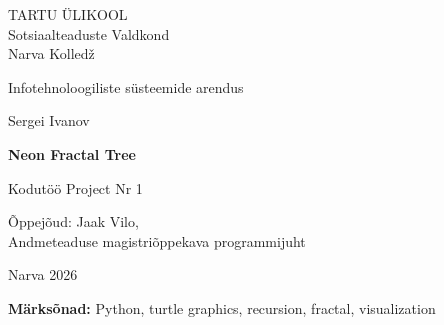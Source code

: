 \begin{titlepage}
    \centering

    {\fontsize{12pt}{14pt}\selectfont 
    TARTU ÜLIKOOL \\
    Sotsiaalteaduste Valdkond \\
    Narva Kolledž \par}

    \vspace{2cm}

    {\fontsize{12pt}{14pt}\selectfont 
    Infotehnoloogiliste süsteemide arendus\par}

    \vspace{2.5cm}

    {\fontsize{12pt}{14pt}\selectfont Sergei Ivanov \par}

    \vspace{1cm}

    {\fontsize{16pt}{20pt}\selectfont \textbf{Neon Fractal Tree} \par}

    \vspace{1cm}

    {\fontsize{12pt}{14pt}\selectfont Kodutöö Project Nr 1 \par}

    \vspace{3cm}

    \begin{flushright}
    {\fontsize{12pt}{14pt}\selectfont 
    Õppejõud: Jaak Vilo, \\
    Andmeteaduse magistriõppekava programmijuht\par}
    \end{flushright}

    \vfill

    {\fontsize{12pt}{14pt}\selectfont Narva 2026 \par}

\end{titlepage}

\begin{abstract}
See report käsitleb Project NR 1 - Neon Fractal Tree, mis on loodud Pythonis, kasutades turtle graafikateeki. Projekt keskendub rekursiivse algoritmi rakendamisele, et luua visuaalselt köitev fraktaalpuu, mille värvid muutuvad dünaamiliselt. Kood on optimeeritud nii, et see jookseb sujuvalt isegi suurema sügavusega, vältides liigset ressursikasutust. Lõpptulemus on esteetiliselt meeldiv ja näitab, kuidas programmeerimine võib olla kunstiline väljendusvorm.
\end{abstract}

\vspace{0.5cm}

\noindent\textbf{Märksõnad:} Python, turtle graphics, recursion, fractal, visualization

\tableofcontents
\clearpage

